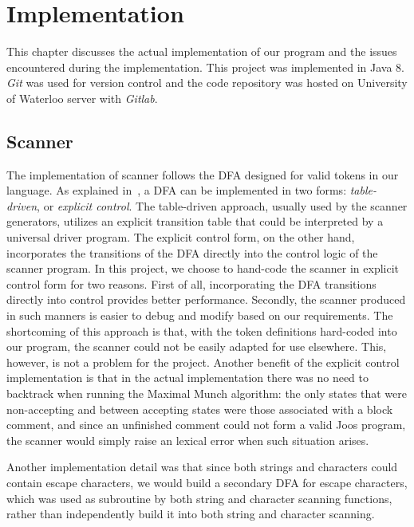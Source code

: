 \chapter{Implementation}
\label{implementation}
This chapter discusses the actual implementation of our program and the issues encountered during the implementation. This project was implemented in Java 8. \emph{Git} was used for version control and the code repository was hosted on University of Waterloo server with \emph{Gitlab}.

\section{Scanner}
\label{scanner_implementation}

The implementation of scanner follows the DFA designed for valid tokens in our language. As explained in~\cite{fischer2009crafting}, a DFA can be implemented in two forms: \emph{table-driven}, or \emph{explicit control}. The table-driven approach, usually used by the scanner generators, utilizes an explicit transition table that could be interpreted by a universal driver program. The explicit control form, on the other hand, incorporates the transitions of the DFA directly into the control logic of the scanner program. In this project, we choose to hand-code the scanner in explicit control form for two reasons. First of all, incorporating the DFA transitions directly into control provides better performance. Secondly, the scanner produced in such manners is easier to debug and modify based on our requirements. The shortcoming of this approach is that, with the token definitions hard-coded into our program, the scanner could not be easily adapted for use elsewhere. This, however, is not a problem for the project. 
Another benefit of the explicit control implementation is that in the actual implementation there was no need to backtrack when running the Maximal Munch algorithm:
  the only states that were non-accepting and between accepting states were those associated with a block comment,
  and since an unfinished comment could not form a valid Joos program, the scanner would simply raise an lexical error when such situation arises.
  

Another implementation detail was that since both strings and characters could contain escape characters, we would build a secondary DFA for escape characters, which was used as subroutine by both string and character scanning functions, rather than independently build it into both string and character scanning.

